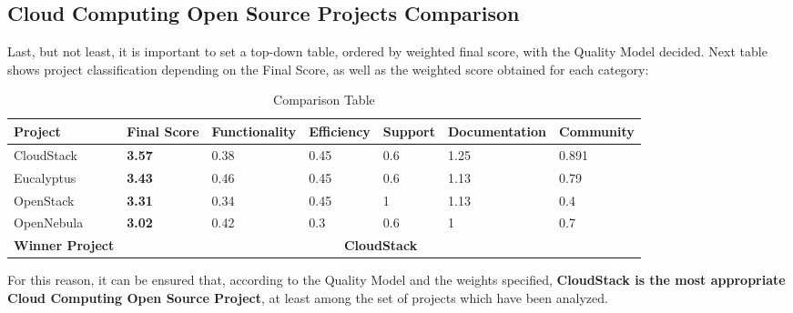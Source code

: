 \documentclass[11pt]{article}
\begin{document}
\subsection{Cloud Computing Open Source Projects Comparison}
Last, but not least, it is important to set a top-down table, ordered by weighted final score, with the Quality Model decided. Next table shows project classification depending on the Final Score, as well as the weighted score obtained for each category:
\begin{table}[H]
  \begin{center}
    \begin{tabular}{ | p{2.5cm} | p{1cm} | p{2.2cm} | p{1.8cm} | p{1.7cm} | p{2.4cm} | p{1.9cm} | }
    \toprule
    Project & \textbf{Final Score} & Functionality & Efficiency & Support & Documentation & Community\\
    \hline
    CloudStack & \textbf{3.57} & 0.38 & 0.45 & 0.6 & 1.25 & 0.891\\
    \hline
    Eucalyptus & \textbf{3.43} & 0.46 & 0.45 & 0.6 & 1.13 & 0.79\\
    \hline
    OpenStack & \textbf{3.31} & 0.34 & 0.45 & 1 & 1.13 & 0.4\\
    \hline
    OpenNebula & \textbf{3.02} & 0.42 & 0.3 & 0.6 & 1 & 0.7\\
    \midrule
    \textbf{Winner Project} & \multicolumn {6}{c|}{\textbf{CloudStack}}\\
    \bottomrule
    \end{tabular}
    \caption{Comparison Table}
    \label{tab:comparison_table}
  \end{center}
\end{table}
For this reason, it can be ensured that, according to the Quality Model and the weights specified, \textbf{CloudStack is the most appropriate Cloud Computing Open Source Project}, at least among the set of projects which have been analyzed.
\end{document}
